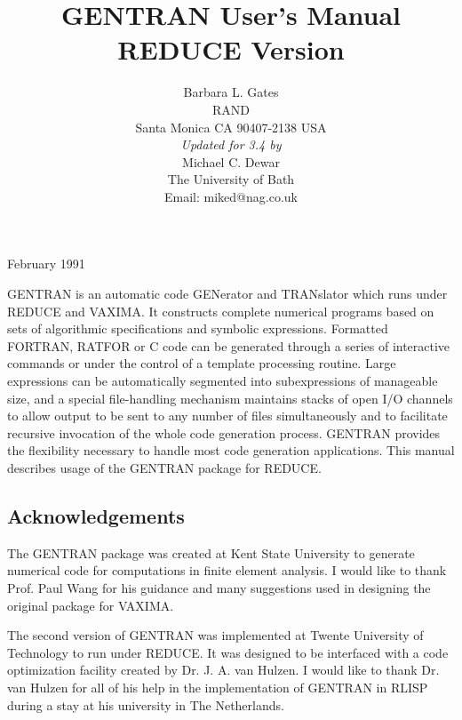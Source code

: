 \title{GENTRAN User's Manual \\ REDUCE Version}
\date{}
\author{Barbara L. Gates \\ RAND \\
Santa Monica CA 90407-2138 USA \\[0.05in]
{\em Updated for {\REDUCE} 3.4 by} \\[0.05in]
Michael C. Dewar \\
The University of Bath \\
Email: miked@nag.co.uk}

\maketitle

 

\begin{center} February 1991 \end{center}

GENTRAN is an automatic code GENerator and TRANslator which runs under
REDUCE and VAXIMA.  It constructs complete numerical
programs based on sets of algorithmic specifications and symbolic
expressions.  Formatted FORTRAN, RATFOR or C code can be generated
through a series of interactive commands or under the control of a
template processing routine.  Large expressions can be automatically
segmented into subexpressions of manageable size, and a special
file-handling mechanism maintains stacks of open I/O channels to allow
output to be sent to any number of files simultaneously and to
facilitate recursive invocation of the whole code generation process.
GENTRAN provides the flexibility necessary to handle most code
generation applications.  This manual describes usage of the GENTRAN
package for REDUCE.

\subsection*{Acknowledgements}

The GENTRAN package was created at Kent State University to generate
numerical code for computations in finite element analysis.  I would
like to thank Prof. Paul Wang for his guidance and many suggestions
used in designing the original package for VAXIMA.

The second version of GENTRAN was implemented at Twente University of
Technology to run under REDUCE.  It was designed to be interfaced with
a code optimization facility created by Dr. J. A. van Hulzen.  I would
like to thank Dr. van Hulzen for all of his help in the implementation
of GENTRAN in RLISP during a stay at his university in The
Netherlands.

